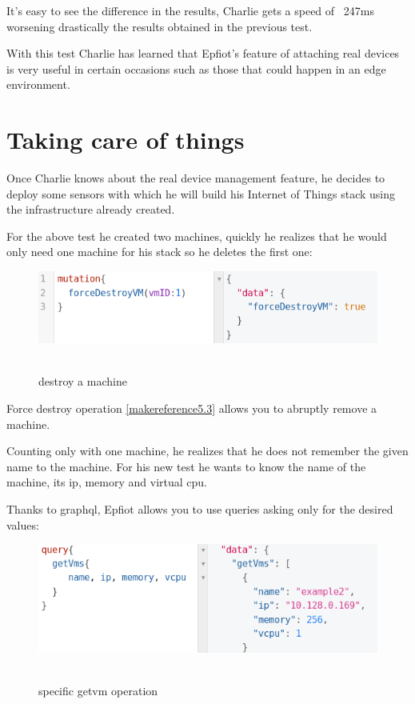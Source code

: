 It's easy to see the difference in the results, Charlie gets a speed of ~247ms worsening drastically the results obtained in the previous test.

With this test Charlie has learned that Epfiot's feature of attaching real devices is very useful in certain occasions such as those that could happen in an edge environment.
\newpage
\section{Taking care of things}
\label{makereference6.4}

Once Charlie knows about the real device management feature, he decides to deploy some sensors with which he will build his Internet of Things stack using the infrastructure already created.

For the above test he created two machines, quickly he realizes that he would only need one machine for his stack so he deletes the first one:

\begin{figure}[h!]%
\centering
    \includegraphics[width=4.5in]{figures/force_destroy.png}
~\caption{destroy a machine}
\label{figure6.10}
\end{figure}

Force destroy operation \ref{makereference5.3} allows you to abruptly remove a machine.

Counting only with one machine, he realizes that he does not remember the given name to the machine. 
For his new test he wants to know the name of the machine, its ip, memory and virtual cpu.

Thanks to graphql, Epfiot allows you to use queries asking only for the desired values:

\begin{figure}[h!]%
\centering
    \includegraphics[width=5.5in]{figures/concrete_getvm.png}
~\caption{specific getvm operation}
\label{figure6.11}
\end{figure}

